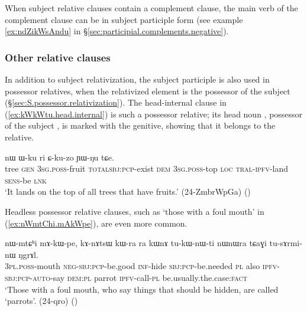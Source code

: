 
When subject relative clauses contain a complement clause, the main verb of the complement clause can be in subject participle form (see example \ref{ex:ndZikWsAndu}  in §\ref{sec:participial.complements.negative}).
 
\subsubsection{Other relative clauses}  \label{sec:subject.participle.other.relative}
In addition to subject relativization, the subject participle is also used in possessor relatives, when the relativized element is the possessor of the subject (§\ref{sec:S.possessor.relativization}).  The head-internal clause in (\ref{ex:kWkWtu.head.internal}) is such a possessor relative; its head noun , possessor of the subject ,  is marked with the genitive, showing that it belongs to the relative.  

\begin{exe}
\ex \label{ex:kWkWtu.head.internal}
  nɯ ɯ-ku ri ɕ-ku-zo ɲɯ-ŋu tɕe. \\
 tree \textsc{gen} \textsc{3sg}.\textsc{poss}-fruit \textsc{total}\redp{}\textsc{sbj}:\textsc{pcp}-exist \textsc{dem} \textsc{3sg}.\textsc{poss}-top \textsc{loc} \textsc{tral}-\textsc{ipfv}-land \textsc{sens}-be \textsc{lnk} \\
 \glt `It lands on the top of all trees that have fruits.' (24-ZmbrWpGa)
()
\end{exe}

 Headless possessor relative clauses, such as   `those with a foul mouth' in (\ref{ex:nWmtChi.mAkWpe}), are even more common.

\begin{exe}
\ex \label{ex:nWmtChi.mAkWpe}
\gll nɯ-mtɕʰi mɤ-kɯ-pe, kɤ-nɤtsɯ kɯ-ra ra kɯnɤ tu-kɯ-nɯ-ti nɯnɯra tɕaɣi tu-sɤrmi-nɯ ŋgrɤl. \\
 \textsc{3pl}.\textsc{poss}-mouth \textsc{neg}-\textsc{sbj}:\textsc{pcp}-be.good \textsc{inf}-hide \textsc{sbj}:\textsc{pcp}-be.needed \textsc{pl} also \textsc{ipfv}-\textsc{sbj}:\textsc{pcp}-\textsc{auto}-say \textsc{dem}:\textsc{pl} parrot \textsc{ipfv}-call-\textsc{pl} be.usually.the.case:\textsc{fact} \\
 \glt `Those with a foul mouth, who say things that should be hidden, are called `parrots'. (24-qro) ()
\end{exe}
 
